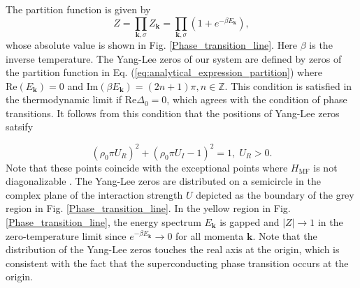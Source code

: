 \documentclass[aps,prl,twocolumn,superscriptaddress]{revtex4-1}
\begin{document}
The partition function is given by
\begin{equation}
Z=\prod_{\bm{k},\sigma}Z_{\bm{k}}=\prod_{\bm{k},\sigma}(1+e^{-\beta E_{\bm{k}}}),\label{eq:analytical_expression_partition}
\end{equation}
whose absolute value is shown in Fig. \ref{Phase_transition_line}. Here $\beta$ is the inverse temperature. 
The Yang-Lee zeros of our system are defined by zeros of the
partition function in Eq. (\ref{eq:analytical_expression_partition})
where $\mathrm{Re}(E_{\bm{k}})=0$ and $\mathrm{Im}(\beta E_{\bm{k}})=(2n+1)\pi,n\in\mathbb{Z}$.
This condition is satisfied in the thermodynamic limit if $\mathrm{Re}\Delta_0=0$,
which agrees with the condition of phase transitions. It follows from this condition that the positions of Yang-Lee zeros satsify

\begin{equation}
(\rho_{0}\pi U_{R})^{2}+(\rho_{0}\pi U_{I}-1)^{2}=1,\;U_{R}>0.\label{eq:phase_transition}
\end{equation}
Note that these points coincide with the exceptional points where $H_{\mathrm{MF}}$
is not diagonalizable \cite{Yamamoto2019}. The Yang-Lee
zeros are distributed on a semicircle in the complex plane of the interaction strength $U$
depicted as the boundary of the grey region in Fig. \ref{Phase_transition_line}. In the yellow region in Fig. \ref{Phase_transition_line}, the energy spectrum $E_{\mathbf{k}}$ is gapped and $|Z|\to 1$ in the zero-temperature limit since $e^{-\beta E_{\bm{k}}}\to 0$ for all momenta $\bm{k}$. Note that the distribution of the Yang-Lee zeros touches the real axis at the origin, which is consistent with the fact that the superconducting phase transition occurs at the origin.
\end{document}
